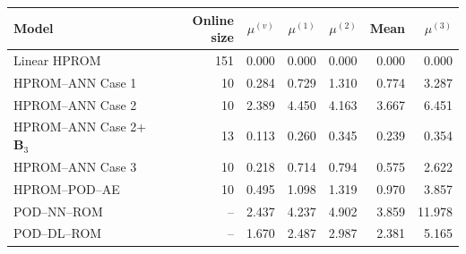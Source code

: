 \begin{tabular}{lr|rrrr|r}
\toprule
Model & Online size & $\mu^{(v)}$ & $\mu^{(1)}$ & $\mu^{(2)}$ & Mean & $\mu^{(3)}$ \\
\midrule
Linear HPROM & 151 & 0.000 & 0.000 & 0.000 & 0.000 & 0.000 \\
HPROM--ANN Case 1 & 10 & 0.284 & 0.729 & 1.310 & 0.774 & 3.287 \\
HPROM--ANN Case 2 & 10 & 2.389 & 4.450 & 4.163 & 3.667 & 6.451 \\
HPROM--ANN Case 2+$\mathbf B_3$ & 13 & 0.113 & 0.260 & 0.345 & 0.239 & 0.354 \\
HPROM--ANN Case 3 & 10 & 0.218 & 0.714 & 0.794 & 0.575 & 2.622 \\
HPROM--POD--AE & 10 & 0.495 & 1.098 & 1.319 & 0.970 & 3.857 \\
\midrule
POD--NN--ROM & -- & 2.437 & 4.237 & 4.902 & 3.859 & 11.978 \\
POD--DL--ROM & -- & 1.670 & 2.487 & 2.987 & 2.381 & 5.165 \\
\bottomrule
\end{tabular}
